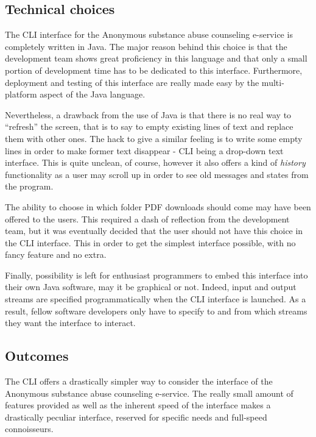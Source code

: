\documentclass[a4paper,12pt, twocolumn]{article}
\begin{document}
\subsection*{Technical choices}

The CLI interface for the Anonymous substance abuse counseling e-service is completely written in Java. The major reason behind this choice is that the development team shows great proficiency in this language and that only a small portion of development time has to be dedicated to this interface. Furthermore, deployment and testing of this interface are really made easy by the multi-platform aspect of the Java language.

Nevertheless, a drawback from the use of Java is that there is no real way to ``refresh'' the screen, that is to say to empty existing lines of text and replace them with other ones. The hack to give a similar feeling is to write some empty lines in order to make former text disappear - CLI being a drop-down text interface. This is quite unclean, of course, however it also offers a kind of \emph{history} functionality as a user may scroll up in order to see old messages and states from the program.

The ability to choose in which folder PDF downloads should come may have been offered to the users. This required a dash of reflection from the development team, but it was eventually decided that the user should not have this choice in the CLI interface. This in order to get the simplest interface possible, with no fancy feature and no extra.

Finally, possibility is left for enthusiast programmers to embed this interface into their own Java software, may it be graphical or not. Indeed, input and output streams are specified programmatically when the CLI interface is launched. As a result, fellow software developers only have to specify to and from which streams they want the interface to interact.

\subsection*{Outcomes}
The CLI offers a drastically simpler way to consider the interface of the Anonymous substance abuse counseling e-service. The really small amount of features provided as well as the inherent speed of the interface makes a drastically peculiar interface, reserved for specific needs and full-speed connoisseurs.\\
\end{document}
